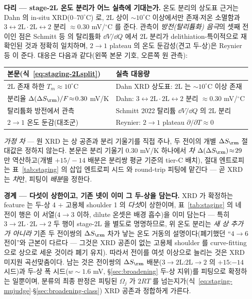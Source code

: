 \begin{srcbox}
\textbf{다리 --- stage-2L 온도 분리가 어느 실측에 기대는가.} 온도 분리의 상도표 근거는 Dahn 의 in-situ
XRD($0$--$70^\circ$C)\cite{dahn1991} 로, $2\mathrm L$ 상이 $\sim\!10^\circ$C 이상에서만 존재$\cdot$저온 소멸함과
$3\!\leftrightarrow\!2\mathrm L\cdot2\mathrm L\!\leftrightarrow\!2$ 분리 $\approx0.30$ mV/$^\circ$C 를 준다. 관측이
\emph{방전(탈리튬화) 음극}의 셋째 전이인 점은 Schmitt 등\cite{schmitt2022} 의 탈리튬화 $\dd V/\dd Q$ 에서 2L
분리가 delithiation-특이적으로 재확인된 것과 정확히 일치하며, $2\!\to\!1$ plateau 의 온도 둔감성(견고 두-상)은
Reynier 등\cite{reynier2003} 이 준다. 대응은 다음과 같다(왼쪽 본문 기호, 오른쪽 원 관측):
\begin{center}\footnotesize
\begin{tabular}{@{}ll@{}}
\hline
본문(식~\eqref{eq:staging-2Lsplit}) & 실측 대응량 \\
\hline
$2\mathrm L$ 존재 하한 $T_m\!\approx\!10^\circ$C & Dahn XRD 상도표: $2\mathrm L$ 는 $\sim\!10^\circ$C 이상 존재\cite{dahn1991} \\
분리율 $\Delta(\Delta S_\rxn)/F\!\approx\!0.30$ mV/K & Dahn: $3\!\leftrightarrow\!2\mathrm L\cdot2\mathrm L\!\leftrightarrow\!2$ 분리 $\approx0.30$ mV/$^\circ$C \\
탈리튬화 방전에서 관측 & Schmitt 2022 탈리튬 $\dd V/\dd Q$ 의 2L 분리\cite{schmitt2022} \\
$2\!\to\!1$ 온도 둔감(대조군) & Reynier: $2\!\to\!1$ plateau $\partial/\partial T\!\approx\!0$\cite{reynier2003} \\
\hline
\end{tabular}
\end{center}
\emph{가정 차} --- 원 XRD 는 상 공존과 분리 기울기를 직접 주나, 두 전이의 개별 $\Delta S_\rxn$ 절대값은 정하지
않는다. 본문은 분리 기울기 $0.30$ mV/K 하나에서 \emph{차} $\Delta(\Delta S_\rxn)\!\approx\!29$ 만 역산하고(개별
$+15/-14$ 배분은 분리쌍 평균 기준의 tier-C 배치), 절대 엔트로피는 표~\ref{tab:staging} 의 삽입 엔트로피
시드\cite{reynier2003} 와 round-trip 피팅에 맡긴다 --- 곧 XRD 는 \emph{차}만, 피팅이 \emph{배분}을 정한다.
\end{srcbox}

\textbf{경계 --- 다섯이 상한이고, 기존 넷이 이미 그 두-상을 담는다.} XRD 가 확정하는 feature 는 두-상 4 $+$
고용체 shoulder 1 의 \emph{다섯}이 상한이며, 표~\ref{tab:staging} 의 네 전이 행은 이 서열($4\!\to\!3$ 이하, dilute
온셋은 배경 흡수)을 이미 담는다 --- 특히 $3\!\to\!2\mathrm L\cdot2\mathrm L\!\to\!2$ 두 행이 stage-2L 을 별도로
명명하므로, 위 온도 분리는 \emph{새 상 추가가 아니라} 기존 두 전이쌍의 $\Delta S_\rxn$ 차가 낳는 온도 거동의
설명이다(폐기했던 ``$4\!\to\!6$ 전이''와 근본이 다르다 --- 그것은 XRD 공존이 없는 고용체 shoulder 를
curve-fitting 으로 상으로 세운 것이라 폐기 유지). 따라서 전이를 여섯 이상으로 늘리는 것은 XRD 미지원
곡선맞춤이다. 남는 것은 전이쌍의 $\Delta S_\rxn$ 배분($3\!\to\!2\mathrm L$:$2\mathrm L\!\to\!2$ 의 $+15$:$-14$ 시드)과
두-상 폭 시드($w\!\sim\!1.6$ mV, \S\ref{sec:broadening} 두-상 지위)를 피팅으로 확정하는 일뿐이며, 분류의 최종
판정은 피팅된 $\Omega_j$ 가 $2RT$ 를 넘는지가(식~\eqref{eq:staging-mujudge}$\cdot$\S\ref{sec:broadening-class})
XRD 공존과 정합하게 가른다.

